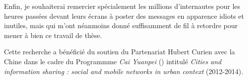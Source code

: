 Enfin, je souhaiterai remercier spécialement les millions d'internautes pour les heures passées devant leurs écrans à poster des messages en apparence idiots et inutiles, mais qui m'ont néanmoins donné suffisamment de fil à retordre pour mener à bien ce travail de thèse.

\bigskip
Cette recherche a bénéficié du soutien du Partenariat Hubert Curien avec la Chine dans le cadre du Programmme \textit{Cai Yuanpei} () intitulé \textit{Cities and information sharing : social and mobile networks in urban context} (2012-2014).